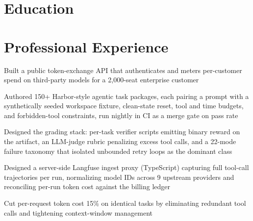 \documentclass[10pt]{article}
\begin{document}


\section{Education}


\section{Professional Experience}
\begin{bullets}
  \item Built a public token-exchange API that authenticates and meters per-customer spend on third-party models for a 2,000-seat enterprise customer
  \item Authored 150+ Harbor-style agentic task packages, each pairing a prompt with a synthetically seeded workspace fixture, clean-state reset, tool and time budgets, and forbidden-tool constraints, run nightly in CI as a merge gate on pass rate
  \item Designed the grading stack: per-task verifier scripts emitting binary reward on the artifact, an LLM-judge rubric penalizing excess tool calls, and a 22-mode failure taxonomy that isolated unbounded retry loops as the dominant class
  \item Designed a server-side Langfuse ingest proxy (TypeScript) capturing full tool-call trajectories per run, normalizing model IDs across 9 upstream providers and reconciling per-run token cost against the billing ledger
  \item Cut per-request token cost 15\% on identical tasks by eliminating redundant tool calls and tightening context-window management
\end{bullets}
\end{document}
